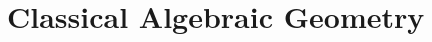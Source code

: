 \documentclass[12pt]{book}
\theoremstyle{definition}
\begin{document}
	\mainmatter
	
	\chapter{Classical Algebraic Geometry}
	
	
	
\end{document}
